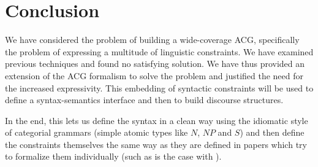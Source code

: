 \documentclass{llncs}
\begin{document}
\section{Conclusion}

We have considered the problem of building a wide-coverage ACG, specifically
the problem of expressing a multitude of linguistic constraints. We have
examined previous techniques and found no satisfying solution. We have thus
provided an extension of the ACG formalism to solve the problem and justified
the need for the increased expressivity. This embedding of syntactic
constraints will be used to define a syntax-semantics interface and then to
build discourse structures.

In the end, this lets us define the syntax in a clean way using the idiomatic
style of categorial grammars (simple atomic types like $N$, $NP$ and $S$) and
then define the constraints themselves the same way as they are defined in
papers which try to formalize them individually (such as is the case with
\cite{pogodalla2012controlling}).

%
%



\end{document}
